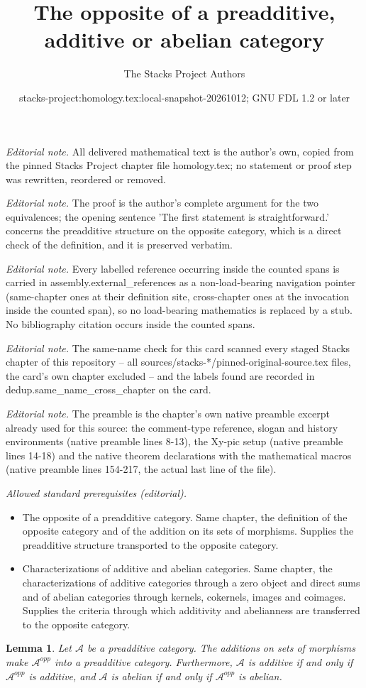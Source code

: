\documentclass[10pt,a4paper]{amsart}
\title{The opposite of a preadditive, additive or abelian category}
\author{The Stacks Project Authors}
\date{stacks-project:homology.tex:local-snapshot-20261012; GNU FDL 1.2 or later}
\theoremstyle{plain}
\newtheorem{lemma}[subsection]{Lemma}
\theoremstyle{definition}
\theoremstyle{remark}
\numberwithin{equation}{subsection}
\begin{document}
\maketitle
\noindent\textit{Editorial note.} All delivered mathematical text is the author's own, copied from the pinned Stacks Project chapter file homology.tex; no statement or proof step was rewritten, reordered or removed.\par\medskip
\noindent\textit{Editorial note.} The proof is the author's complete argument for the two equivalences; the opening sentence 'The first statement is straightforward.' concerns the preadditive structure on the opposite category, which is a direct check of the definition, and it is preserved verbatim.\par\medskip
\noindent\textit{Editorial note.} Every labelled reference occurring inside the counted spans is carried in assembly.external\_references as a non-load-bearing navigation pointer (same-chapter ones at their definition site, cross-chapter ones at the invocation inside the counted span), so no load-bearing mathematics is replaced by a stub. No bibliography citation occurs inside the counted spans.\par\medskip
\noindent\textit{Editorial note.} The same-name check for this card scanned every staged Stacks chapter of this repository -- all sources/stacks-*/pinned-original-source.tex files, the card's own chapter excluded -- and the labels found are recorded in dedup.same\_name\_cross\_chapter on the card.\par\medskip
\noindent\textit{Editorial note.} The preamble is the chapter's own native preamble excerpt already used for this source: the comment-type reference, slogan and history environments (native preamble lines 8-13), the Xy-pic setup (native preamble lines 14-18) and the native theorem declarations with the mathematical macros (native preamble lines 154-217, the actual last line of the file).\par\medskip
\noindent\textit{Allowed standard prerequisites (editorial).}\begin{itemize}
\item The opposite of a preadditive category. Same chapter, the definition of the opposite category and of the addition on its sets of morphisms. Supplies the preadditive structure transported to the opposite category.
\item Characterizations of additive and abelian categories. Same chapter, the characterizations of additive categories through a zero object and direct sums and of abelian categories through kernels, cokernels, images and coimages. Supplies the criteria through which additivity and abelianness are transferred to the opposite category.
\end{itemize}\medskip
\begin{lemma}
\label{lemma-abelian-opposite}
Let $\mathcal{A}$ be a preadditive category.
The additions on sets of morphisms make
$\mathcal{A}^{opp}$ into a preadditive category.
Furthermore, $\mathcal{A}$ is additive if and only if $\mathcal{A}^{opp}$
is additive, and
$\mathcal{A}$ is abelian if and only if $\mathcal{A}^{opp}$ is abelian.
\end{lemma}
\end{document}
